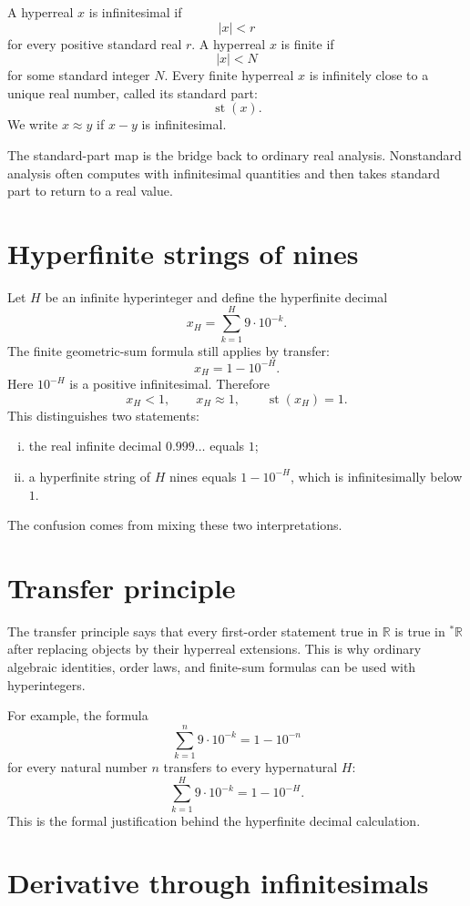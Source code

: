 A hyperreal $x$ is infinitesimal if
\[
  |x|<r
\]
for every positive standard real $r$.  A hyperreal $x$ is finite if
\[
  |x|<N
\]
for some standard integer $N$.  Every finite hyperreal $x$ is infinitely close to a unique real number, called its standard part:
\[
  \operatorname{st}(x).
\]
We write $x\approx y$ if $x-y$ is infinitesimal.

The standard-part map is the bridge back to ordinary real analysis.  Nonstandard analysis often computes with infinitesimal quantities and then takes standard part to return to a real value.

\section{Hyperfinite strings of nines}

Let $H$ be an infinite hyperinteger and define the hyperfinite decimal
\[
  x_H=\sum_{k=1}^{H}9\cdot10^{-k}.
\]
The finite geometric-sum formula still applies by transfer:
\[
  x_H=1-10^{-H}.
\]
Here $10^{-H}$ is a positive infinitesimal.  Therefore
\[
  x_H<1,
  \qquad
  x_H\approx1,
  \qquad
  \operatorname{st}(x_H)=1.
\]
This distinguishes two statements:
\begin{enumerate}[(i)]
  \item the real infinite decimal $0.999\ldots$ equals $1$;
  \item a hyperfinite string of $H$ nines equals $1-10^{-H}$, which is infinitesimally below $1$.
\end{enumerate}
The confusion comes from mixing these two interpretations.

\section{Transfer principle}

The transfer principle says that every first-order statement true in $\mathbb R$ is true in $^*\mathbb R$ after replacing objects by their hyperreal extensions.  This is why ordinary algebraic identities, order laws, and finite-sum formulas can be used with hyperintegers.

For example, the formula
\[
  \sum_{k=1}^n 9\cdot10^{-k}=1-10^{-n}
\]
for every natural number $n$ transfers to every hypernatural $H$:
\[
  \sum_{k=1}^{H}9\cdot10^{-k}=1-10^{-H}.
\]
This is the formal justification behind the hyperfinite decimal calculation.

\section{Derivative through infinitesimals}

